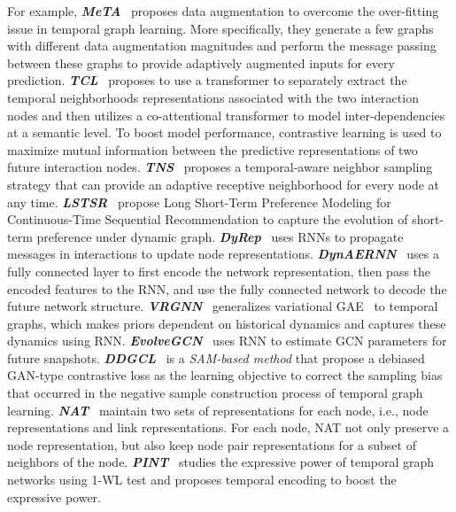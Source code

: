 For example, 
\textit{\textbf{MeTA}}~\cite{wang2021adaptive} proposes data augmentation to overcome the over-fitting issue in temporal graph learning. More specifically, they generate a few graphs with different data augmentation magnitudes and perform the message passing between these graphs to provide adaptively augmented inputs for every prediction.
\textit{\textbf{TCL}}~\cite{wang2021tcl} proposes to use a transformer to separately extract the temporal neighborhoods representations associated with the two interaction nodes and then utilizes a co-attentional transformer to model inter-dependencies at a semantic level. To boost model performance, contrastive learning is used to maximize mutual information between the predictive representations of two future interaction nodes.
\textit{\textbf{TNS}}~\cite{wang2021time} proposes a temporal-aware neighbor sampling strategy that can provide an adaptive receptive neighborhood for every node at any time.
\textit{\textbf{LSTSR}}~\cite{chi2022long} propose Long Short-Term Preference Modeling for Continuous-Time Sequential Recommendation to capture the evolution of short-term preference under dynamic graph.
\textit{\textbf{DyRep}}~\cite{trivedi2019dyrep} uses RNNs to propagate messages in interactions to update node representations.
\textit{\textbf{DynAERNN}}~\cite{goyal2018dyngraph2vec} uses a fully connected layer to first encode the network representation, then pass the encoded features to the RNN, and use the fully connected network to decode the future network structure.
\textit{\textbf{VRGNN}}~\cite{hajiramezanali2019variational} generalizes variational GAE~\cite{kipf2016variational} to temporal graphs, which makes priors dependent on historical dynamics and captures these dynamics using RNN.
\textit{\textbf{EvolveGCN}}~\cite{pareja2020evolvegcn} uses RNN to estimate GCN parameters for future snapshots.
\textit{\textbf{DDGCL}}~\cite{DDGCL} is a \emph{SAM-based method} that propose a debiased GAN-type contrastive loss as the learning objective to correct the sampling bias that occurred in the negative sample construction process of temporal graph learning.
\textit{\textbf{NAT}}~\cite{luo2022neighborhood} maintain two sets of representations for each node, i.e., node representations and link representations. For each node, NAT not only preserve a node representation, but also keep node pair representations for a subset of neighbors of the node. 
\textit{\textbf{PINT}}~\cite{souza2022provably} studies the expressive power of temporal graph networks using 1-WL test and proposes temporal encoding to boost the expressive power.


